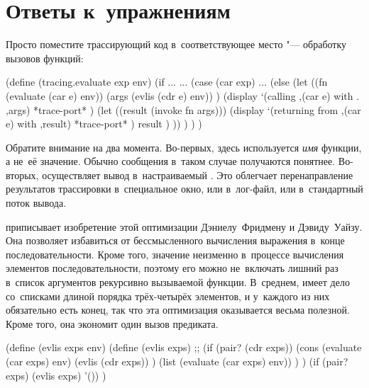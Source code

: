 \chapter{Ответы к~упражнениям}%



Просто поместите трассирующий код в~соответствующее место "--- обработку вызовов
функций:

\begin{code:lisp}
(define (tracing.evaluate exp env)
  (if ...
      ...
      (case (car exp)
        ...
        (else (let ((fn   (evaluate (car e) env))
                    (args (evlis (cdr e) env)) )
                (display `(calling ,(car e) with . ,args)
                         *trace-port* )
                (let ((result (invoke fn args)))
                  (display `(returning from ,(car e) with ,result)
                           *trace-port* )
                  result ) )) ) ) )
\end{code:lisp}

Обратите внимание на два момента. Во-первых, здесь используется \emph{имя}
функции, а не~её значение. Обычно сообщения в~таком случае получаются понятнее.
Во-вторых,  осуществляет вывод в~настраиваемый .
Это облегчает перенаправление результатов трассировки в~специальное окно, или
в~лог-файл, или в~стандартный поток вывода.



\cite{wan80b} приписывает изобретение этой оптимизации Дэниелу~Фридмену и
Дэвиду~Уайзу. Она позволяет избавиться от бессмысленного вычисления выражения
 в~конце последовательности. Кроме того, значение 
неизменно в~процессе вычисления элементов последовательности, поэтому его можно
не~включать лишний раз в~список аргументов рекурсивно вызываемой функции.
В~среднем,  имеет дело со~списками длиной порядка трёх-четырёх
элементов, и у~каждого из них обязательно есть конец, так что эта оптимизация
оказывается весьма полезной. Кроме того, она экономит один вызов предиката.

\begin{code:lisp}
(define (evlis exps env)
  (define (evlis exps)
    ;; 
    (if (pair? (cdr exps))
        (cons (evaluate (car exps) env)
              (evlis (cdr exps)) )
        (list (evaluate (car exps) env)) ) )
  (if (pair? exps) (evlis exps) '()) )
\end{code:lisp}


